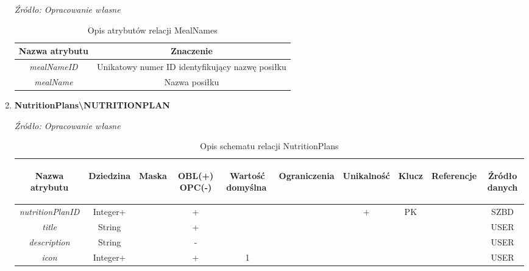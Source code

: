 \documentclass[12pt,oneside]{report}
\begin{document}
\begin{enumerate}[start=10,label={\bfseries REL\textbackslash\arabic*}]
	\begin{table}[H]
		\caption{Opis atrybutów relacji MealNames}
		\textit{Źródło: Opracowanie własne}
		\label{MealNamesAttributeDescription}
		\centering
		\begin{tabular}{|c|c|}
			\hline
			Nazwa atrybutu & Znaczenie \\			
			\hline			
			\textit{mealNameID}&Unikatowy numer ID identyfikujący nazwę posiłku\\	
			\hline			
			\textit{mealName}& Nazwa posiłku\\	
			\hline
		\end{tabular}
	\end{table}
	\item \textbf{NutritionPlans\textbackslash NUTRITIONPLAN} \begin{table}[H]
		\caption{Opis schematu relacji NutritionPlans}
		\textit{Źródło: Opracowanie własne}
		\label{NutritionPlansRelationSchema}
		\centering
		\begin{tabular}{|c|c|c|c|c|c|c|c|c|c|}
			\hline
			\begin{sideways}Nazwa atrybutu\end{sideways}& 
			\begin{sideways}Dziedzina \end{sideways}& 
			\begin{sideways}Maska \end{sideways}& 
			\begin{sideways}OBL(+) OPC(-)\end{sideways} & 
			\begin{sideways}Wartość domyślna$\ $\end{sideways}& 
			\begin{sideways}Ograniczenia\end{sideways} &
			\begin{sideways}Unikalność \end{sideways}& 
			\begin{sideways}Klucz \end{sideways}& 
			\begin{sideways}Referencje \end{sideways}&
			\begin{sideways}Źródło danych\end{sideways}\\
			\hline			
			\textit{nutritionPlanID}&Integer+&&+&&&+&PK&&SZBD\\	
			\hline			
			\textit{title}&String&&+&&&&&&USER\\	
			\hline			
			\textit{description}&String&&-&&&&&&USER\\	
			\hline			
			\textit{icon}&Integer+&&+&1&&&&&USER\\	
			\hline
		\end{tabular}
	\end{table}
	

\end{enumerate}
\end{document}
